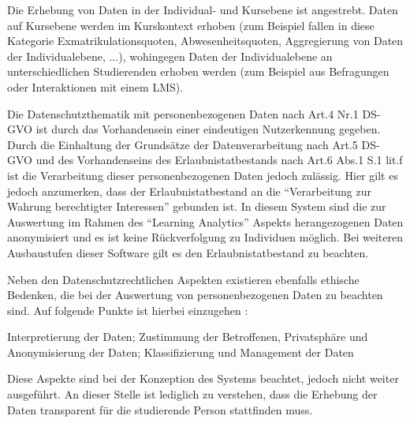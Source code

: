 Die Erhebung von Daten in der Individual- und Kursebene ist angestrebt. Daten auf Kursebene werden im Kurskontext erhoben (zum Beispiel fallen in diese Kategorie Exmatrikulationsquoten, Abwesenheitsquoten, Aggregierung von Daten der Individualebene, $\ldots$), wohingegen Daten der Individualebene an unterschiedlichen Studierenden erhoben werden (zum Beispiel aus Befragungen oder Interaktionen mit einem \ac{LMS}).

Die Datenschutzthematik mit personenbezogenen Daten nach Art.4 Nr.1 DS-GVO ist durch das Vorhandensein einer eindeutigen Nutzerkennung gegeben. Durch die Einhaltung der Grundsätze der Datenverarbeitung nach Art.5 DS-GVO und des Vorhandenseins des Erlaubnistatbestands nach Art.6 Abs.1 S.1 lit.f ist die Verarbeitung dieser personenbezogenen Daten jedoch zulässig. Hier gilt es jedoch anzumerken, dass der Erlaubnistatbestand an die \enquote{Verarbeitung zur Wahrung berechtigter Interessen} gebunden ist. In diesem System sind die zur Auswertung im Rahmen des \enquote{Learning Analytics} Aspekts herangezogenen Daten anonymisiert und es ist keine Rückverfolgung zu Individuen möglich. Bei weiteren Ausbaustufen dieser Software gilt es den Erlaubnistatbestand zu beachten. 

Neben den Datenschutzrechtlichen Aspekten existieren ebenfalls ethische Bedenken, die bei der Auswertung von personenbezogenen Daten zu beachten sind. Auf folgende Punkte ist hierbei einzugehen \autocite[S.1510]{learningAnalyticsEthicalUssuesAndDilemmas}:

	Interpretierung der Daten; Zustimmung der Betroffenen, Privatsphäre und Anonymisierung der Daten; Klassifizierung und Management der Daten
	
Diese Aspekte sind bei der Konzeption des Systems beachtet, jedoch nicht weiter ausgeführt. An dieser Stelle ist lediglich zu verstehen, dass die Erhebung der Daten transparent für die studierende Person stattfinden muss. 
	

